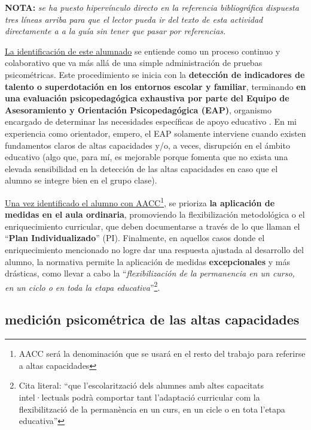 \documentclass[12pt, a4paper]{article}
\begin{document}
		\begin{tcolorbox}[
	 			colback=gray!10,
	 			colframe=gray!50,
	 			boxrule=0.5pt,
	 			arc=2mm]
			\textbf{NOTA:} \textit{se ha puesto hipervínculo directo en la referencia bibliográfica dispuesta tres líneas arriba para que el lector pueda ir del texto de esta actividad directamente a a la guía sin tener que pasar por referencias.}
		\end{tcolorbox}
	  \underline{La identificación de este alumnado} se entiende como un proceso continuo y colaborativo que va más allá de una simple administración de pruebas psicométricas. Este procedimiento se inicia con la \textbf{detección de indicadores de talento o superdotación en los entornos escolar y familiar}, terminando \textbf{en una evaluación psicopedagógica exhaustiva por parte del Equipo de Asesoramiento y Orientación Psicopedagógica (EAP)}, organismo encargado de determinar las necesidades específicas de apoyo educativo \parencite[15]{gencatAltesCapacitats2013}. En mi experiencia como orientador, empero, el EAP solamente interviene cuando existen fundamentos claros de altas capacidades y/o, a veces, disrupción en el ámbito educativo (algo que, para mí, es mejorable porque fomenta que no exista una elevada sensibilidad en la detección de las altas capacidades en caso que el alumno se integre bien en el grupo clase).
	
	 \underline{Una vez identificado el alumno con AACC}\footnote{AACC será la denominación que se usará en el resto del trabajo para referirse a altas capacidades}, se prioriza \textbf{la aplicación de medidas en el aula ordinaria}, promoviendo la flexibilización metodológica o el enriquecimiento curricular, que deben documentarse a través de lo que llaman el ``\textbf{Plan Individualizado}'' (PI). Finalmente, en aquellos casos donde el enriquecimiento mencionado no logre dar una respuesta ajustada al desarrollo del alumno, la normativa permite la aplicación de medidas \textbf{excepcionales} y más drásticas, como llevar a cabo la ``\textit{flexibilización de la permanencia en un curso, en un ciclo o en toda la etapa educativa}''\parencite[4]{resolucioENS1543_2013}\footnote{Cita literal: ``que l’escolarització dels alumnes amb altes capacitats intel·lectuals podrà comportar tant l’adaptació curricular com la flexibilització de la permanència en un curs, en un cicle o en tota l’etapa educativa''}.
	 
	 
	 
	 	\subsection{medición psicométrica de las altas capacidades}
	 	\label{subsec:medicionPsicometrica}
			 	
\end{document}
